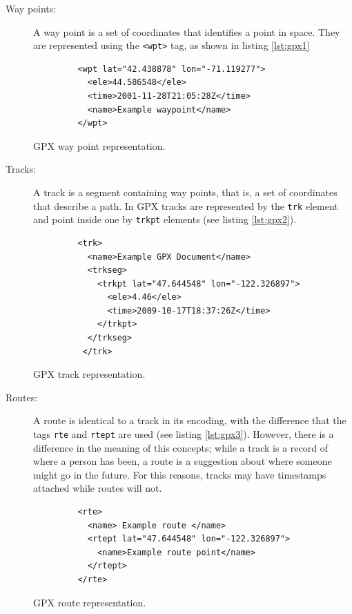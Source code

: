 \begin{description}
\item[Way points:] A way point is a set of coordinates that identifies a point in space. They are represented using the \texttt{<wpt>} tag, as shown in listing \ref{lst:gpx1}

\begin{listing}\centering
  \begin{minipage}{.5\textwidth}
    \begin{verbatim}
	     <wpt lat="42.438878" lon="-71.119277">
	       <ele>44.586548</ele>
	       <time>2001-11-28T21:05:28Z</time>
	       <name>Example waypoint</name>
	     </wpt>
    \end{verbatim}
  \end{minipage}
  \caption{GPX way point representation.}\label{lst:gpx1}
\end{listing}


\item[Tracks:] A track is a segment containing way points, that is, a set of coordinates that describe a path. In GPX tracks are represented by the \texttt{trk} element and point inside one by \texttt{trkpt} elements (see listing \ref{lst:gpx2}).

\begin{listing}\centering
  \begin{minipage}{.5\textwidth}
    \begin{verbatim}
	     <trk>
	       <name>Example GPX Document</name>
	       <trkseg>
	         <trkpt lat="47.644548" lon="-122.326897">
	           <ele>4.46</ele>
	           <time>2009-10-17T18:37:26Z</time>
	         </trkpt>
	       </trkseg>
	      </trk>
    \end{verbatim}
  \end{minipage}
  \caption{GPX track representation.}\label{lst:gpx2}
\end{listing}

\item[Routes:] A route is identical to a track in its encoding, with the difference that the tags \texttt{rte} and \texttt{rtept} are used (see listing \ref{lst:gpx3}). However, there is a difference in the meaning of this concepts; while a track is a record of where a person has been, a route is a suggestion about where someone might go in the future. For this reasons, tracks may have timestamps attached while routes will not.

\begin{listing}\centering
  \begin{minipage}{.5\textwidth}
    \begin{verbatim}
	     <rte>
	       <name> Example route </name>
	       <rtept lat="47.644548" lon="-122.326897">
	         <name>Example route point</name>
	       </rtept>
	     </rte>
    \end{verbatim}
  \end{minipage}
  \caption{GPX route representation.}\label{lst:gpx3}
\end{listing}

\end{description}

